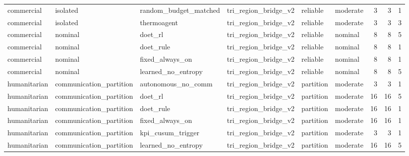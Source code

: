 \begin{table}
\begin{tabular}{llllllrrr}
  commercial &                isolated &  random\_budget\_matched & tri\_region\_bridge\_v2 &      reliable &   moderate &         3 &                         3 &                         1 \\
  commercial &                isolated &            thermoagent & tri\_region\_bridge\_v2 &      reliable &   moderate &         3 &                         3 &                         3 \\
  commercial &                 nominal &                doet\_rl & tri\_region\_bridge\_v2 &      reliable &    nominal &         8 &                         8 &                         5 \\
  commercial &                 nominal &              doet\_rule & tri\_region\_bridge\_v2 &      reliable &    nominal &         8 &                         8 &                         1 \\
  commercial &                 nominal &        fixed\_always\_on & tri\_region\_bridge\_v2 &      reliable &    nominal &         8 &                         8 &                         1 \\
  commercial &                 nominal &     learned\_no\_entropy & tri\_region\_bridge\_v2 &      reliable &    nominal &         8 &                         8 &                         5 \\
humanitarian & communication\_partition &     autonomous\_no\_comm & tri\_region\_bridge\_v2 &     partition &   moderate &         3 &                         3 &                         1 \\
humanitarian & communication\_partition &                doet\_rl & tri\_region\_bridge\_v2 &     partition &   moderate &        16 &                        16 &                         5 \\
humanitarian & communication\_partition &              doet\_rule & tri\_region\_bridge\_v2 &     partition &   moderate &        16 &                        16 &                         1 \\
humanitarian & communication\_partition &        fixed\_always\_on & tri\_region\_bridge\_v2 &     partition &   moderate &        16 &                        16 &                         1 \\
humanitarian & communication\_partition &      kpi\_cusum\_trigger & tri\_region\_bridge\_v2 &     partition &   moderate &         3 &                         3 &                         1 \\
humanitarian & communication\_partition &     learned\_no\_entropy & tri\_region\_bridge\_v2 &     partition &   moderate &        16 &                        16 &                         5 \\

\end{tabular}
\end{table}
